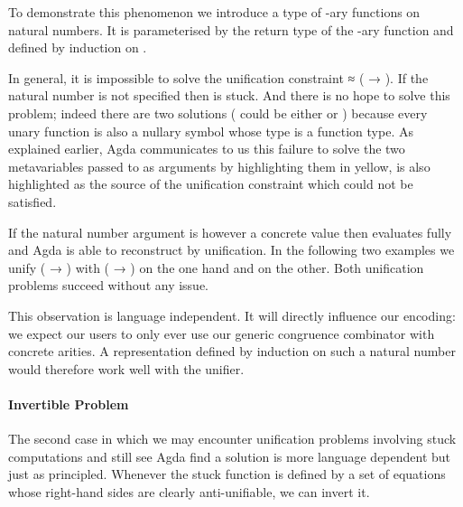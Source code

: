 To demonstrate this phenomenon we introduce a type  of -ary
functions on natural numbers. It is parameterised by the return type of the
-ary function and defined by induction on .


In general, it is impossible to solve the unification constraint
{  } ≈ {( → )}. If the natural number
is not specified then  is stuck. And there is no hope to solve
this problem; indeed there are two solutions ( could be either 
or ) because every unary function is also a nullary symbol whose type
is a function type. As explained earlier, Agda communicates to us this
failure to solve the two metavariables passed to  as arguments by
highlighting them in yellow,  is also highlighted as the source
of the unification constraint which could not be satisfied.


If the natural number argument is however a concrete value then 
evaluates fully and Agda is able to reconstruct  by unification. In
the following two examples we unify {( → )} with {( → )}
on the one hand and {} on the other. Both unification problems succeed
without any issue.

\begin{minipage}{0.225\textwidth}
\end{minipage}\begin{minipage}{0.225\textwidth}
\end{minipage}

This observation is language independent. It will directly influence our
encoding: we expect our users to only ever use our generic congruence
combinator with concrete arities. A representation defined by induction
on such a natural number would therefore work well with the unifier.

\paragraph{Invertible Problem}\label{sec:unifierinversion}
The second case in which we may encounter
unification problems involving stuck computations and still see Agda
find a solution is more language dependent but just as principled.
Whenever the stuck function is defined by a set of equations whose
right-hand sides are clearly anti-unifiable, we can invert it.

